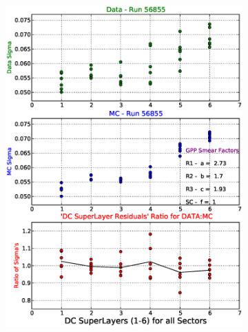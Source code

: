 \begin{figure}[htpb]\begin{center}
\begin{subfigure}{0.47\columnwidth}
    \includegraphics[width=\columnwidth]{figures/calib/dc/DC_Sigma_SL.eps}
    \label{fig:DC_SL_best}
\end{subfigure}
\begin{subfigure}{0.47\columnwidth}

\end{subfigure}
\end{center}
\end{figure}
